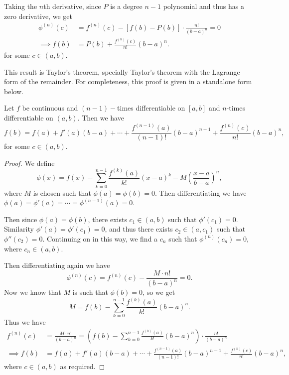 \documentclass[a4paper]{scrartcl}
\begin{document}
Taking the $n$th derivative, since $P$ is a degree $n - 1$ polynomial and thus has a zero derivative, we get
\begin{align*}
	\phi^{(n)}(c) &= f^{(n)}(c) - [f(b) - P(b)] \cdot \frac{n!}{(b - a)^n} = 0 \\
\implies f(b)  &= P(b) + \frac{f^{(n)}(c)}{n!}(b - a)^n.
\end{align*}
for some $c \in (a, b)$. 

This result is Taylor's theorem, specially Taylor's theorem with the Lagrange form of the remainder. For completeness, this proof is given in a standalone form below.

\begin{theorem}
	Let $f$ be continuous and $(n - 1)-$times differentiable on $[a, b]$ and $n$-times differentiable on $(a, b)$. Then we have
	$$
	f(b) = f(a) + f'(a)(b - a) + \cdots + \frac{f^{(n - 1)}(a)}{(n - 1)!}(b - a)^{n - 1} + \frac{f^{(n)}(c)}{n!}(b - a)^n,
	$$
	for some $c \in (a, b)$.
\end{theorem}
\begin{proof}
	We define
	$$
	\phi(x) = f(x) - \sum_{k = 0}^{n - 1} \frac{f^{(k)}(a)}{k!}(x - a)^k - M \left(\frac{x - a}{b - a}\right)^n,
	$$
	where $M$ is chosen such that $\phi(a) = \phi(b) = 0$.
	Then differentiating we have $\phi(a) = \phi'(a) = \cdots = \phi^{(n - 1)}(a) = 0$. 

	Then since $\phi(a) = \phi(b)$, there exists $c_1 \in (a, b)$ such that $\phi'(c_1) = 0$. Similarity $\phi'(a) = \phi'(c_1) = 0$, and thus there exists $c_2 \in (a, c_1)$ such that $\phi''(c_2) = 0$. Continuing on in this way, we find a $c_{n}$ such that $\phi^{(n)}(c_n) = 0$, where $c_n \in (a, b)$. 

	Then differentiating again we have
	$$
	\phi^{(n)}(c) = f^{(n)}(c) - \frac{M \cdot n!}{(b - a)^n} = 0.
	$$
	Now we know that $M$ is such that $\phi(b) = 0$, so we get
	$$
	M = f(b) - \sum_{k = 0}^{n - 1}\frac{f^{(k)}(a)}{k!} (b - a)^n.
	$$
	Thus we have
	\begin{align*}
		f^{(n)}(c) &= \frac{M \cdot n!}{(b - a)^n} = \left(f(b) - \sum_{k = 0}^{n - 1}\frac{f^{(k)}(a)}{k!} (b - a)^n\right) \cdot \frac{n!}{(b - a)^n} \\
\implies f(b) &= f(a) + f'(a)(b - a) + \cdots + \frac{f^{(n - 1)}(a)}{(n - 1)!}(b - a)^{n - 1} + \frac{f^{(n)}(c)}{n!}(b - a)^n,
	\end{align*}
	where $c \in (a, b)$ as required.
\end{proof}
\end{document}
